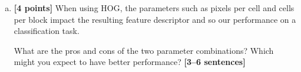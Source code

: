 \begin{enumerate}[(a)]
\begin{enumerate}[(i)]
\begin{enumerate}[1.]
\end{enumerate}
\end{enumerate}

\pagebreak
\item \textbf{[4 points]}
When using HOG, the parameters such as pixels per cell and cells per block impact the resulting feature descriptor and so our performance on a classification task.

\begin{tcolorbox}[colback=orange!5!white,colframe=orange!75!black]
    What are the pros and cons of the two parameter combinations? Which might you expect to have better performance? \textbf{[3--6 sentences]}
\end{tcolorbox}


\end{enumerate}







